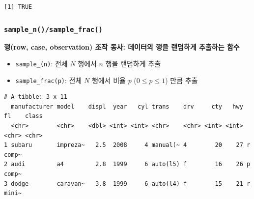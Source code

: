 \documentclass[
  11pt,
]{krantz}
\makeatletter
\newenvironment{Shaded}{\begin{snugshade}}{\end{snugshade}}
\newcommand{\CommentTok}[1]{\textcolor[rgb]{0.37,0.37,0.37}{\textit{#1}}}
\newcommand{\DecValTok}[1]{\textcolor[rgb]{0.06,0.06,0.06}{#1}}
\newcommand{\KeywordTok}[1]{\textcolor[rgb]{0.27,0.27,0.27}{\textbf{#1}}}
\newcommand{\NormalTok}[1]{#1}
\newcommand{\OperatorTok}[1]{\textcolor[rgb]{0.43,0.43,0.43}{\textbf{#1}}}
\newcommand{\StringTok}[1]{\textcolor[rgb]{0.5,0.5,0.5}{#1}}
\providecommand{\tightlist}{%
  \setlength{\itemsep}{0pt}\setlength{\parskip}{0pt}}
\newenvironment{kframe}{%
\medskip{}
\setlength{\fboxsep}{.8em}
 \def\at@end@of@kframe{}%
 \ifinner\ifhmode%
  \def\at@end@of@kframe{\end{minipage}}%
  \begin{minipage}{\columnwidth}%
 \fi\fi%
 \def\FrameCommand##1{\hskip\@totalleftmargin \hskip-\fboxsep
 \colorbox{shadecolor}{##1}\hskip-\fboxsep
     \hskip-\linewidth \hskip-\@totalleftmargin \hskip\columnwidth}%
 \MakeFramed {\advance\hsize-\width
   \@totalleftmargin\z@ \linewidth\hsize
   \@setminipage}}%
 {\par\unskip\endMakeFramed%
 \at@end@of@kframe}
\renewenvironment{quote}{\begin{kframe}}{\end{kframe}}
\makeatother
\begin{document}
\begin{Shaded}
\end{Shaded}

\begin{verbatim}
[1] TRUE
\end{verbatim}

\normalsize

\hypertarget{dplyr-sample}{%
\subsubsection*{\texorpdfstring{\texttt{sample\_n()/sample\_frac()}}{sample\_n()/sample\_frac()}}\label{dplyr-sample}}


\begin{quote}
\textbf{행(row, case, observation) 조작 동사: 데이터의 행을 랜덤하게 추출하는 함수}
\end{quote}

\begin{itemize}
\tightlist
\item
  \texttt{sample\_(n)}: 전체 \(N\) 행에서 \(n\) 행을 랜덤하게 추출
\item
  \texttt{sample\_frac(p)}: 전체 \(N\) 행에서 비율 \(p\) (\(0\leq p \leq1\)) 만큼 추출
\end{itemize}

\footnotesize

\begin{Shaded}
\end{Shaded}

\begin{verbatim}
# A tibble: 3 x 11
  manufacturer model    displ  year   cyl trans    drv     cty   hwy fl    class
  <chr>        <chr>    <dbl> <int> <int> <chr>    <chr> <int> <int> <chr> <chr>
1 subaru       impreza~   2.5  2008     4 manual(~ 4        20    27 r     comp~
2 audi         a4         2.8  1999     6 auto(l5) f        16    26 p     comp~
3 dodge        caravan~   3.8  1999     6 auto(l4) f        15    21 r     mini~
\end{verbatim}
\end{document}
